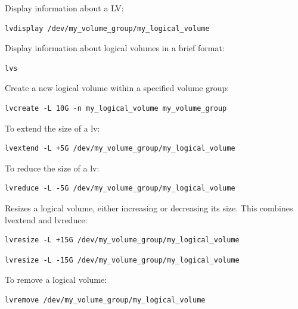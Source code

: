 \documentclass{article}
\newenvironment{codetemplate}[1][]{%
  \mybasecolorbox[#1]
  \itshape
}{%
  \endmybasecolorbox
}
\begin{document}
Display information about a LV:
\begin{codetemplate}
\begin{verbatim}
lvdisplay /dev/my_volume_group/my_logical_volume
\end{verbatim}
\end{codetemplate}

Display information about logical volumes in a brief format:
\begin{codetemplate}
\begin{verbatim}
lvs
\end{verbatim}
\end{codetemplate}

Create a new logical volume within a specified volume group:
\begin{codetemplate}
\begin{verbatim}
lvcreate -L 10G -n my_logical_volume my_volume_group
\end{verbatim}
\end{codetemplate}

To extend the size of a lv:
\begin{codetemplate}
\begin{verbatim}
lvextend -L +5G /dev/my_volume_group/my_logical_volume
\end{verbatim}
\end{codetemplate}

To reduce the size of a lv:
\begin{codetemplate}
\begin{verbatim}
lvreduce -L -5G /dev/my_volume_group/my_logical_volume
\end{verbatim}
\end{codetemplate}

Resizes a logical volume, either increasing or decreasing its size. This combines lvextend and lvreduce:
\begin{codetemplate}
\begin{verbatim}
lvresize -L +15G /dev/my_volume_group/my_logical_volume
\end{verbatim}
\end{codetemplate}
\begin{codetemplate}
\begin{verbatim}
lvresize -L -15G /dev/my_volume_group/my_logical_volume
\end{verbatim}
\end{codetemplate}

To remove a logical volume:
\begin{codetemplate}
\begin{verbatim}
lvremove /dev/my_volume_group/my_logical_volume
\end{verbatim}
\end{codetemplate}
\end{document}
